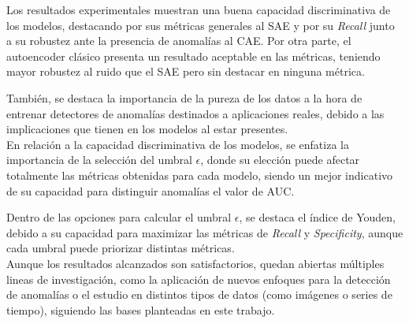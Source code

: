 \documentclass[a4paper,10pt]{book}
\begin{document}
Los resultados experimentales muestran una buena capacidad discriminativa de los modelos, destacando por sus métricas generales al SAE y por su \emph{Recall} junto a su robustez ante la presencia de anomalías al CAE. Por otra parte, el autoencoder clásico presenta un resultado aceptable en las métricas, teniendo mayor robustez al ruido que el SAE pero sin destacar en ninguna métrica.

También, se destaca la importancia de la pureza de los datos a la hora de entrenar detectores de anomalías destinados a aplicaciones reales, debido a las implicaciones que tienen en los modelos al estar presentes.\\

En relación a la capacidad discriminativa de los modelos, se enfatiza la importancia de la selección del umbral $\epsilon$, donde su elección puede afectar totalmente las métricas obtenidas para cada modelo, siendo un mejor indicativo de su capacidad  para distinguir anomalías el valor de AUC.

Dentro de las opciones para calcular el umbral $\epsilon$, se destaca el índice de Youden, debido a su capacidad para maximizar las métricas de \emph{Recall} y \emph{Specificity}, aunque cada umbral puede priorizar distintas métricas.\\

Aunque los resultados alcanzados son satisfactorios, quedan abiertas múltiples lineas de investigación, como la aplicación de nuevos enfoques para la detección de anomalías o el estudio en distintos tipos de datos (como imágenes o series de tiempo), siguiendo las bases planteadas en este trabajo.



\end{document}
